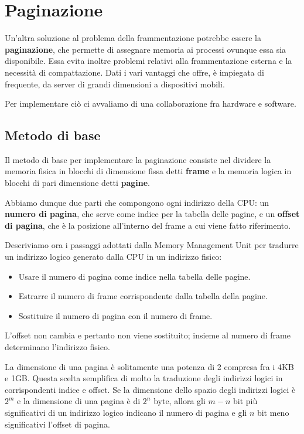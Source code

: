 \section{Paginazione}
    Un'altra soluzione al problema della frammentazione potrebbe essere la \textbf{paginazione}, che permette di assegnare memoria ai processi ovunque essa sia disponibile. Essa evita inoltre problemi relativi alla frammentazione esterna e la necessità di compattazione. Dati i vari vantaggi che offre, è impiegata di frequente, da server di grandi dimensioni a dispositivi mobili.
    
    Per implementare ciò ci avvaliamo di una collaborazione fra hardware e software.
    
    \subsection{Metodo di base}
        Il metodo di base per implementare la paginazione consiste nel dividere la memoria fisica in blocchi di dimensione fissa detti \textbf{frame} e la memoria logica in blocchi di pari dimensione detti \textbf{pagine}.
        
        Abbiamo dunque due parti che compongono ogni indirizzo della CPU: un \textbf{numero di pagina}, che serve come indice per la tabella delle pagine, e un \textbf{offset di pagina}, che è la posizione all'interno del frame a cui viene fatto riferimento.
        
        Descriviamo ora i passaggi adottati dalla Memory Management Unit per tradurre un indirizzo logico generato dalla CPU in un indirizzo fisico:
        \begin{itemize}
            \item Usare il numero di pagina come indice nella tabella delle pagine.
            
            \item Estrarre il numero di frame corrispondente dalla tabella della pagine.
            
            \item Sostituire il numero di pagina con il numero di frame.
        \end{itemize}
        
        L'offset non cambia e pertanto non viene sostituito; insieme al numero di frame determinano l'indirizzo fisico.
        
        La dimensione di una pagina è solitamente una potenza di 2 compresa fra i 4KB e 1GB. Questa scelta semplifica di molto la traduzione degli indirizzi logici in corrispondenti indice e offset. Se la dimensione dello spazio degli indirizzi logici è $2^m$ e la dimensione di una pagina è di $2^n$ byte, allora gli $m - n$ bit più significativi di un indirizzo logico indicano il numero di pagina e gli $n$ bit meno significativi l'offset di pagina.
        

